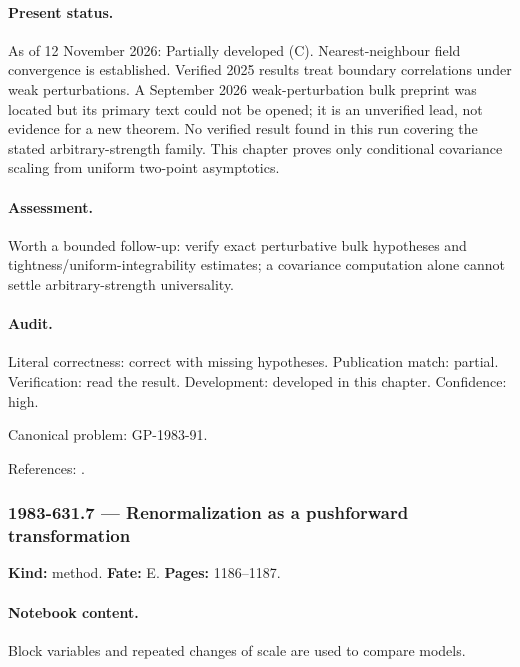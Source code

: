 \paragraph{Present status.} As of 12 November 2026: Partially developed (C). Nearest-neighbour field convergence is established. Verified 2025 results treat boundary correlations under weak perturbations. A September 2026 weak-perturbation bulk preprint was located but its primary text could not be opened; it is an unverified lead, not evidence for a new theorem. No verified result found in this run covering the stated arbitrary-strength family. This chapter proves only conditional covariance scaling from uniform two-point asymptotics.

\paragraph{Assessment.} Worth a bounded follow-up: verify exact perturbative bulk hypotheses and tightness/uniform-integrability estimates; a covariance computation alone cannot settle arbitrary-strength universality.

\paragraph{Audit.} Literal correctness: correct with missing hypotheses. Publication match: partial. Verification: read the result. Development: developed in this chapter. Confidence: high.

\noindent Canonical problem: GP-1983-91.\par

\noindent References: \citep{camia2015magnetization,cavagiulianigreenblatt2025boundary,openai2026isingunverified}.\par

\subsubsection{1983-631.7 --- Renormalization as a pushforward transformation}

\label{item:1983-631.7}

\noindent\textbf{Kind:} method. \textbf{Fate:} E. \textbf{Pages:} 1186--1187.\par

\paragraph{Notebook content.} Block variables and repeated changes of scale are used to compare models.

